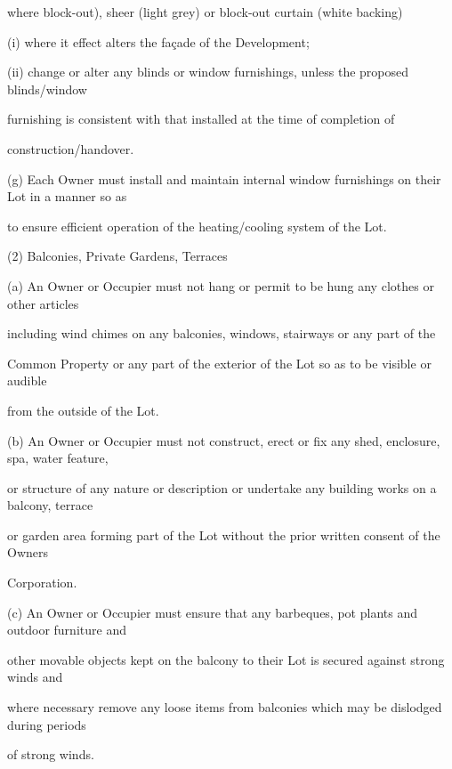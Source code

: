 \documentclass{article}
\begin{document}
{\fontsize{10.02}{1}where block-out), sheer (light grey) or block-out curtain (white backing)  }

{\fontsize{9.962}{1}(i) where it effect alters the façade of the Development; }

{\fontsize{9.962}{1}(ii) change or alter any blinds or window furnishings, unless the proposed blinds/window }

{\fontsize{10.02}{1}furnishing is consistent with that installed at the time of completion of }

{\fontsize{10.02}{1}construction/handover. }

{\fontsize{9.962}{1}(g) Each Owner must install and maintain internal window furnishings on their Lot in a manner so as }

{\fontsize{10.02}{1}to ensure efficient operation of the heating/cooling system of the Lot. }

{\fontsize{9.962}{1}(2) Balconies, Private Gardens, Terraces }

{\fontsize{9.962}{1}(a) An Owner or Occupier must not hang or permit to be hung any clothes or other articles }

{\fontsize{10.02}{1}including wind chimes on any balconies, windows, stairways or any part of the  }

{\fontsize{10.02}{1}Common Property or any part of the exterior of the Lot so as to be visible or audible }

{\fontsize{10.02}{1}from the outside of the Lot. }

{\fontsize{9.962}{1}(b) An Owner or Occupier must not construct, erect or fix any shed, enclosure, spa, water feature, }

{\fontsize{10.02}{1}or structure of any nature or description or undertake any building works on a balcony, terrace }

{\fontsize{10.02}{1}or garden area forming part of the Lot without the prior written consent of the Owners }

{\fontsize{10.02}{1}Corporation. }

{\fontsize{9.962}{1}(c) An Owner or Occupier must ensure that any barbeques, pot plants and outdoor furniture and }

{\fontsize{10.02}{1}other movable objects kept on the balcony to their Lot is secured against strong winds and }

{\fontsize{10.02}{1}where necessary remove any loose items from balconies which may be dislodged during periods }

{\fontsize{10.02}{1}of strong winds. }
\end{document}
